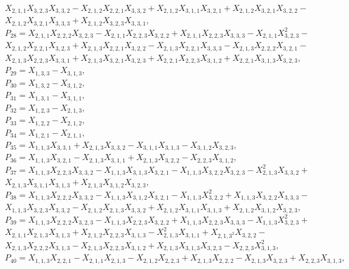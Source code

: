 \documentclass[10pt]{beamer}
\begin{document}
$X_{2,1,1}X_{3,2,3}X_{3,3,2}-X_{2,1,2}X_{2,2,1}X_{3,3,2}+X_{2,1,2}X_{3,1,1}X_{3,2,1}+X_{2,1,2}X_{3,2,1}X_{3,2,2}-$\\
$X_{2,1,2}X_{3,2,1}X_{3,3,3}+X_{2,1,2}X_{3,2,3}X_{3,3,1},$\\
$P_{28}=X_{2,1,1}X_{2,2,2}X_{3,2,3}-X_{2,1,1}X_{2,2,3}X_{3,2,2}+X_{2,1,1}X_{2,2,3}X_{3,3,3}-X_{2,1,1}X_{3,2,3}^2-$\\
$X_{2,1,2}X_{2,2,1}X_{3,2,3}+X_{2,1,3}X_{2,2,1}X_{3,2,2}-X_{2,1,3}X_{2,2,1}X_{3,3,3}-X_{2,1,3}X_{2,2,2}X_{3,2,1}-$\\
$X_{2,1,3}X_{2,2,3}X_{3,3,1}+X_{2,1,3}X_{3,2,1}X_{3,2,3}+X_{2,2,1}X_{2,2,3}X_{3,1,2}+X_{2,2,1}X_{3,1,3}X_{3,2,3},$\\
$P_{29}=X_{1,3,3}-X_{3,1,3},$\\
$P_{30}=X_{1,3,2}-X_{3,1,2},$\\
$P_{31}=X_{1,3,1}-X_{3,1,1},$\\
$P_{32}=X_{1,2,3}-X_{2,1,3},$\\
$P_{33}=X_{1,2,2}-X_{2,1,2},$\\
$P_{34}=X_{1,2,1}-X_{2,1,1},$\\
$P_{35}=X_{1,1,3}X_{3,3,1}+X_{2,1,3}X_{3,3,2}-X_{3,1,1}X_{3,1,3}-X_{3,1,2}X_{3,2,3},$\\
$P_{36}=X_{1,1,3}X_{3,2,1}-X_{2,1,3}X_{3,1,1}+X_{2,1,3}X_{3,2,2}-X_{2,2,3}X_{3,1,2},$\\
$P_{37}=X_{1,1,3}X_{2,2,3}X_{3,3,2}-X_{1,1,3}X_{3,1,3}X_{3,2,1}-X_{1,1,3}X_{3,2,2}X_{3,2,3}-X_{2,1,3}^2X_{3,3,2}+$\\
$X_{2,1,3}X_{3,1,1}X_{3,1,3}+X_{2,1,3}X_{3,1,2}X_{3,2,3},$\\
$P_{38}=X_{1,1,3}X_{2,2,2}X_{3,3,2}-X_{1,1,3}X_{3,1,2}X_{3,2,1}-X_{1,1,3}X_{3,2,2}^2+X_{1,1,3}X_{3,2,2}X_{3,3,3}-$\\
$X_{1,1,3}X_{3,2,3}X_{3,3,2}-X_{2,1,2}X_{2,1,3}X_{3,3,2}+X_{2,1,2}X_{3,1,1}X_{3,1,3}+X_{2,1,2}X_{3,1,2}X_{3,2,3},$\\
$P_{39}=X_{1,1,3}X_{2,2,2}X_{3,2,3}-X_{1,1,3}X_{2,2,3}X_{3,2,2}+X_{1,1,3}X_{2,2,3}X_{3,3,3}-X_{1,1,3}X_{3,2,3}^2+$\\
$X_{2,1,1}X_{2,1,3}X_{3,1,3}+X_{2,1,2}X_{2,2,3}X_{3,1,3}-X_{2,1,3}^2X_{3,1,1}+X_{2,1,3^2}X_{3,2,2}-$\\
$X_{2,1,3}X_{2,2,2}X_{3,1,3}-X_{2,1,3}X_{2,2,3}X_{3,1,2}+X_{2,1,3}X_{3,1,3}X_{3,2,3}-X_{2,2,3}X_{3,1,3}^2,$\\
$P_{40}=X_{1,1,3}X_{2,2,1}-X_{2,1,1}X_{2,1,3}-X_{2,1,2}X_{2,2,3}+X_{2,1,3}X_{2,2,2}-X_{2,1,3}X_{3,2,3}+X_{2,2,3}X_{3,1,3},$\\
\end{document}
